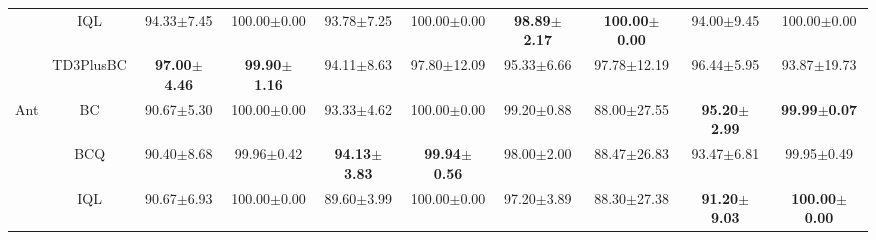 \begin{table}[!ht]
\begin{tabular}{cccccccccc}
                                                                                           & IQL                                                                                        & 94.33$\pm$7.45          & 100.00$\pm$0.00          & 93.78$\pm$7.25          & 100.00$\pm$0.00         & \textbf{98.89$\pm$2.17} & \textbf{100.00$\pm$0.00}                                              & 94.00$\pm$9.45          & 100.00$\pm$0.00                                                             \\
                                                                                           & TD3PlusBC                                                                                  & \textbf{97.00$\pm$4.46} & \textbf{99.90$\pm$1.16}  & 94.11$\pm$8.63          & 97.80$\pm$12.09         & 95.33$\pm$6.66          & 97.78$\pm$12.19                                                       & 96.44$\pm$5.95          & 93.87$\pm$19.73                                                             \\ 
    \cline{2-10}
    \multirow{4}{*}{Ant}                                                                   & BC                                                                                         & 90.67$\pm$5.30          & 100.00$\pm$0.00          & 93.33$\pm$4.62          & 100.00$\pm$0.00         & 99.20$\pm$0.88          & 88.00$\pm$27.55                                                       & \textbf{95.20$\pm$2.99} & \textbf{99.99$\pm$0.07}                                                     \\
                                                                                           & BCQ                                                                                        & 90.40$\pm$8.68          & 99.96$\pm$0.42           & \textbf{94.13$\pm$3.83} & \textbf{99.94$\pm$0.56} & 98.00$\pm$2.00          & 88.47$\pm$26.83                                                       & 93.47$\pm$6.81          & 99.95$\pm$0.49                                                              \\
                                                                                           & IQL                                                                                        & 90.67$\pm$6.93          & 100.00$\pm$0.00          & 89.60$\pm$3.99          & 100.00$\pm$0.00         & 97.20$\pm$3.89          & 88.30$\pm$27.38                                                       & \textbf{91.20$\pm$9.03} & \textbf{100.00$\pm$0.00}                                                    \\

\end{tabular}
\end{table}
